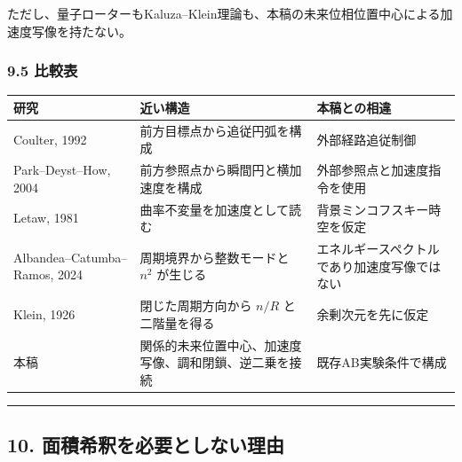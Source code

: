 \documentclass[
  10pt,
  a4paper,
]{ltjsarticle}
\newcounter{none} %
\begin{document}
ただし、量子ローターもKaluza--Klein理論も、本稿の未来位相位置中心による加速度写像を持たない。

\subsubsection{9.5 比較表}\label{ux6bd4ux8f03ux8868}

{\def\LTcaptype{none} %
\begin{longtable}[]{@{}
  >{\raggedright\arraybackslash}p{}
  >{\raggedright\arraybackslash}p{}
  >{\raggedright\arraybackslash}p{}@{}}
\toprule\noalign{}
\begin{minipage}[b]{\linewidth}\raggedright
研究
\end{minipage} & \begin{minipage}[b]{\linewidth}\raggedright
近い構造
\end{minipage} & \begin{minipage}[b]{\linewidth}\raggedright
本稿との相違
\end{minipage} \\
\midrule\noalign{}
\endhead
\bottomrule\noalign{}
\endlastfoot
Coulter, 1992 & 前方目標点から追従円弧を構成 & 外部経路追従制御 \\
Park--Deyst--How, 2004 & 前方参照点から瞬間円と横加速度を構成 &
外部参照点と加速度指令を使用 \\
Letaw, 1981 & 曲率不変量を加速度として読む &
背景ミンコフスキー時空を仮定 \\
Albandea--Catumba--Ramos, 2024 & 周期境界から整数モードと \(n^2\)
が生じる & エネルギースペクトルであり加速度写像ではない \\
Klein, 1926 & 閉じた周期方向から \(n/R\) と二階量を得る &
余剰次元を先に仮定 \\
本稿 & 関係的未来位置中心、加速度写像、調和閉鎖、逆二乗を接続 &
既存AB実験条件で構成 \\
\end{longtable}
}

\begin{center}\rule{0.5\linewidth}{0.5pt}\end{center}

\subsection{10.
面積希釈を必要としない理由}\label{ux9762ux7a4dux5e0cux91c8ux3092ux5fc5ux8981ux3068ux3057ux306aux3044ux7406ux7531}
\end{document}
